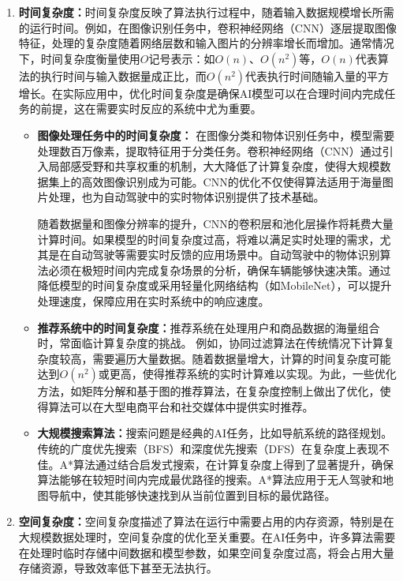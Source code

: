 \begin{enumerate}
\item {\bf 时间复杂度：}时间复杂度反映了算法执行过程中，随着输入数据规模增长所需的运行时间。例如，在图像识别任务中，卷积神经网络（CNN）逐层提取图像特征，处理的复杂度随着网络层数和输入图片的分辨率增长而增加。通常情况下，时间复杂度衡量使用$O$记号表示：如$O(n)$、$O(n^2)$等，$O(n)$代表算法的执行时间与输入数据量成正比，而$O(n^2)$代表执行时间随输入量的平方增长。在实际应用中，优化时间复杂度是确保AI模型可以在合理时间内完成任务的前提，这在需要实时反应的系统中尤为重要。

\begin{itemize}
\item {\bf 图像处理任务中的时间复杂度：} 在图像分类和物体识别任务中，模型需要处理数百万像素，提取特征用于分类任务。卷积神经网络（CNN）通过引入局部感受野和共享权重的机制，大大降低了计算复杂度，使得大规模数据集上的高效图像识别成为可能。CNN的优化不仅使得算法适用于海量图片处理，也为自动驾驶中的实时物体识别提供了技术基础。

随着数据量和图像分辨率的提升，CNN的卷积层和池化层操作将耗费大量计算时间。如果模型的时间复杂度过高，将难以满足实时处理的需求，尤其是在自动驾驶等需要实时反馈的应用场景中。自动驾驶中的物体识别算法必须在极短时间内完成复杂场景的分析，确保车辆能够快速决策。通过降低模型的时间复杂度或采用轻量化网络结构（如MobileNet），可以提升处理速度，保障应用在实时系统中的响应速度。

\item {\bf 推荐系统中的时间复杂度：}推荐系统在处理用户和商品数据的海量组合时，常面临计算复杂度的挑战。
例如，协同过滤算法在传统情况下计算复杂度较高，需要遍历大量数据。随着数据量增大，计算的时间复杂度可能达到$O(n^2)$或更高，使得推荐系统的实时计算难以实现。为此，一些优化方法，如矩阵分解和基于图的推荐算法，在复杂度控制上做出了优化，使得算法可以在大型电商平台和社交媒体中提供实时推荐。

\item {\bf 大规模搜索算法：}搜索问题是经典的AI任务，比如导航系统的路径规划。传统的广度优先搜索（BFS）和深度优先搜索（DFS）在复杂度上表现不佳。A*算法通过结合启发式搜索，在计算复杂度上得到了显著提升，确保算法能够在较短时间内完成最优路径的搜索。A*算法应用于无人驾驶和地图导航中，使其能够快速找到从当前位置到目标的最优路径。
\end{itemize}

\item {\bf 空间复杂度：}空间复杂度描述了算法在运行中需要占用的内存资源，特别是在大规模数据处理时，空间复杂度的优化至关重要。在AI任务中，许多算法需要在处理时临时存储中间数据和模型参数，如果空间复杂度过高，将会占用大量存储资源，导致效率低下甚至无法执行。


\end{enumerate}
